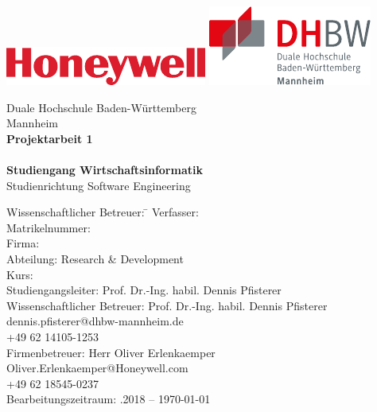 \begin{titlepage}
\begin{minipage}{\textwidth}
		\vspace{-2cm}
		\noindent \includegraphics{img/firmenlogo.pdf} \hfill   \includegraphics{img/dhbwlogo.pdf}
\end{minipage}
\vspace{1em}
\sffamily
\begin{center}
	\textsf{\large{}Duale Hochschule Baden-W\"urttemberg\\[1.5mm] Mannheim}\\[2em]
	\textsf{\textbf{\Large{}Projektarbeit 1}}\\[3mm]
	\textsf{\textbf{\DerTitelDerArbeit}} \\[1.5cm]
	\textsf{\textbf{\Large{}Studiengang Wirtschaftsinformatik}\\[3mm] \textsf{Studienrichtung Software Engineering}}
	
	\vspace{3em}
\vfill

\begin{minipage}{\textwidth}

\begin{tabbing}
	Wissenschaftlicher Betreuer: \hspace{0.85cm}\=\kill
	Verfasser: \> \DerAutorDerArbeit \\[1.5mm]
	Matrikelnummer:  \\[1.5mm]
	Firma: \> \DerNameDerFirma  \\[1.5mm]
	Abteilung: \> Research \& Development \\[1.5mm]
	Kurs: \> \DieKursbezeichnung \\[1.5mm]
	Studiengangsleiter: \> Prof. Dr.-Ing. habil. Dennis Pfisterer  \\[1.5mm]
	Wissenschaftlicher Betreuer: \>Prof. Dr.-Ing. habil. Dennis Pfisterer \\
	\> dennis.pfisterer@dhbw-mannheim.de \\
	\> +49 62 14105-1253 \\[1.5mm]
	Firmenbetreuer: \> Herr Oliver Erlenkaemper \\
	\> Oliver.Erlenkaemper@Honeywell.com \\
	\> +49 62 18545-0237 \\[1.5mm]
	Bearbeitungszeitraum: .2018 -- \today
\end{tabbing}
\end{minipage}

\end{center}

\end{titlepage}